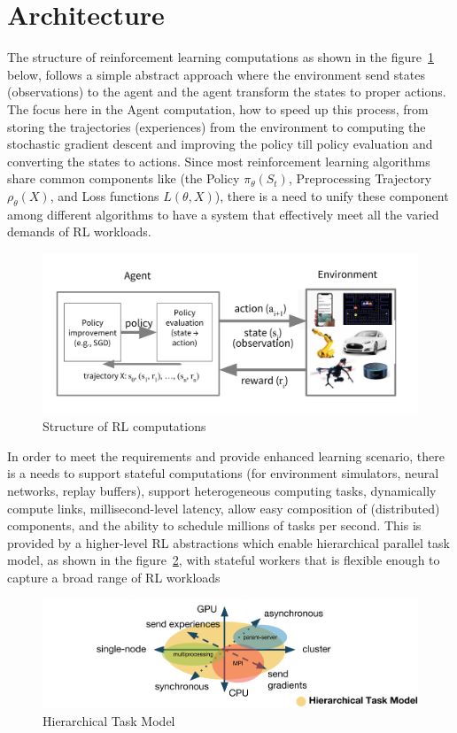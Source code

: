 \section{Architecture}

The structure of reinforcement learning computations as shown in the figure~\ref{fig:rl_computation} below, follows a simple abstract approach where the environment send states (observations) to the agent and the agent transform the states to proper actions. The focus here in the Agent computation, how to speed up this process, from storing the trajectories (experiences) from the environment to computing the stochastic gradient descent and improving the policy till policy evaluation and converting the states to actions. Since most reinforcement learning algorithms share common components like (the Policy \(\pi_{\theta}\left(S_{t}\right)\), Preprocessing Trajectory \(\rho_{\theta}(X)\), and Loss functions \(L(\theta, X)\)), there is a need to unify these component among different algorithms to have a system that effectively meet all the varied demands of RL workloads.
\begin{figure}[!htb]
	\centering
	\includegraphics[width=\linewidth]{figures/architecture/rl_computation.png}
	\caption{Structure of RL computations}
	\label{fig:rl_computation}
\end{figure}

In order to meet the requirements and provide enhanced learning scenario, there is a needs to support stateful computations (for environment simulators, neural networks, replay buffers), support heterogeneous computing tasks, dynamically compute links, millisecond-level latency, allow easy composition of (distributed) components, and the ability to schedule millions of tasks per second. This is provided by a higher-level RL abstractions which enable hierarchical parallel task model, as shown in the figure~\ref{fig:rl_htm}, with stateful workers that is flexible enough to capture a broad range of RL workloads 
\begin{figure}[!htb]
	\centering
	\includegraphics[width=\linewidth]{figures/architecture/htm.png}
	\caption{Hierarchical Task Model}
	\label{fig:rl_htm}
\end{figure}

